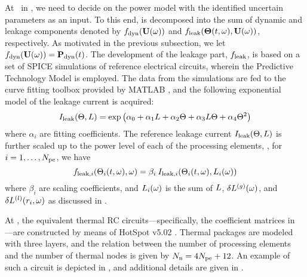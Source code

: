At \ in , we need to decide on the power model with the identified uncertain parameters as an input. To this end,  is decomposed into the sum of dynamic and leakage components denoted by $f_{\text{dyn}}(\mathbf{U}(\omega))$ and $f_{\text{leak}}({\boldsymbol\Theta}(t, \omega), \mathbf{U}(\omega))$, respectively. As motivated in the previous subsection, we let $f_{\text{dyn}}(\mathbf{U}(\omega)) = \mathbf{P}_{\text{dyn}}(t)$. The development of the leakage part, $f_{\text{leak}}$, is based on a set of SPICE simulations of reference electrical circuits, wherein the Predictive Technology Model \cite{ptm} is employed. The data from the simulations are fed to the curve fitting toolbox provided by MATLAB \cite{matlab}, and the following exponential model of the leakage current is acquired:
\begin{equation} \elabel{leakage-current}
  I_\leak(\T, \Leff) = \exp \left( \alpha_0 + \alpha_1 \Leff + \alpha_2 \T + \alpha_3 \Leff \T + \alpha_4 \T^2 \right)
\end{equation}
where $\alpha_i$ are fitting coefficients. The reference leakage current $I_{\text{leak}}(\Theta, L)$ is further scaled up to the power level of each of the processing elements, \ie, for $i = 1, \dotsc, {N_\text{pe}}$, we have
\[
  f_{\text{leak}, i}(\Theta_i(t, \omega), \omega) = \beta_i \: I_{\text{leak}, i}(\Theta_i(t, \omega), L_i(\omega))
\]
where $\beta_i$ are scaling coefficients, and $L_i(\omega)$ is the sum of $L$, ${\delta L^{(g)}}(\omega)$, and $\delta L^{(l)}(r_i, \omega)$ as discussed in .

At , the equivalent thermal RC circuits---specifically, the coefficient matrices in ---are constructed by means of HotSpot v5.02 \cite{hotspot}. Thermal packages are modeled with three layers, and the relation between the number of processing elements and the number of thermal nodes is given by $N_\text{n} = 4 {N_\text{pe}} + 12$. An example of such a circuit is depicted in , and additional details are given in .
